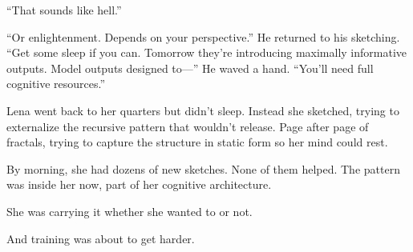 ``That sounds like hell.''

``Or enlightenment. Depends on your perspective.'' He returned to his sketching. ``Get some sleep if you can. Tomorrow they're introducing maximally informative outputs. Model outputs designed to—'' He waved a hand. ``You'll need full cognitive resources.''

Lena went back to her quarters but didn't sleep. Instead she sketched, trying to externalize the recursive pattern that wouldn't release. Page after page of fractals, trying to capture the structure in static form so her mind could rest.

By morning, she had dozens of new sketches. None of them helped. The pattern was inside her now, part of her cognitive architecture.

She was carrying it whether she wanted to or not.

And training was about to get harder.
